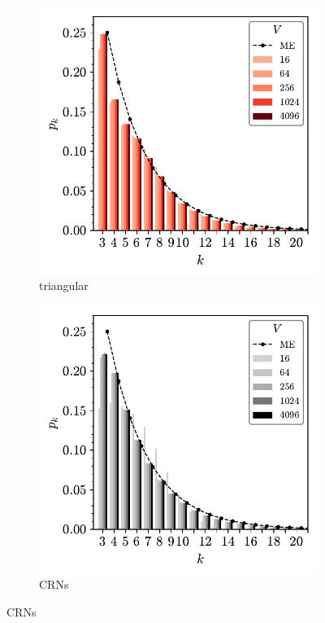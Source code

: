 \begin{figure}[btp]
     \vspace{2mm}
     \begin{subfigure}[b]{0.40\textwidth}
         \centering
         \includegraphics[width=\textwidth]{./figures/procrystals/tri3_pk.pdf}
         \caption{triangular}
         \label{fig:pro3pke}
     \end{subfigure}
     \hspace{1cm}
      \begin{subfigure}[b]{0.40\textwidth}
         \centering
         \includegraphics[width=\textwidth]{./figures/procrystals/netmc_pk.pdf}
         \caption{CRNs}
         \label{fig:pro3pkf}
     \end{subfigure}
    

\end{figure}
